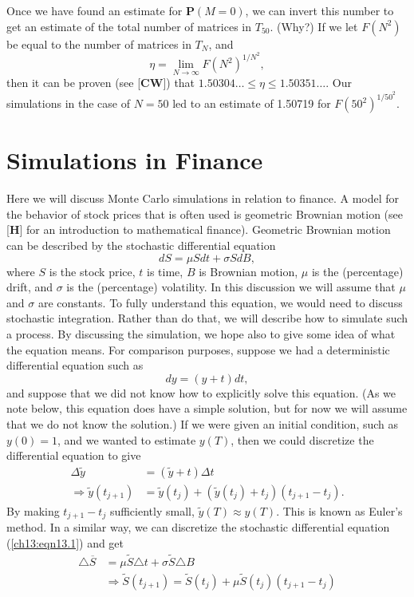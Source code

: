 \documentclass{stml-l}
\theoremstyle{definition}
\numberwithin{equation}{chapter}
\numberwithin{figure}{chapter}
\numberwithin{figure}{section}
\begin{document}
Once we have found an estimate for $\mathbf{P}(M=0)$, we can invert
this number to get an estimate of the total number of matrices in
$T_{50}$. (Why?) If we let $F(N^{2})$ be equal to the number of
matrices in $T_{N}$, and
\begin{equation*}
\eta=\lim_{N\rightarrow\infty}F(N^{2})^{1/N^{2}},
\end{equation*}
then it can be proven (see [\textbf{CW}]) that
$1.50304\ldots\leq\eta\leq 1.50351\ldots$. Our simulations in the
case of $N=50$ led to an estimate of 1.50719 for
$F(50^{2})^{1/50^{2}}$.


\chapter{Simulations in Finance\label{ch13:chap13}}

Here we will discuss Monte Carlo simulations in relation to finance.
A model for the behavior of stock prices that is often used is
geometric Brownian motion (see [\textbf{H}] for an introduction to
mathematical finance). Geometric Brownian motion can be described by
the stochastic differential equation
\begin{equation}
\label{ch13:eqn13.1}dS=\mu Sdt+\sigma SdB,
\end{equation}
where $S$ is the stock price, $t$ is time, $B$ is Brownian motion,
$\mu$ is the (percentage) drift, and $\sigma$ is the (percentage)
volatility. In this discussion we will assume that $\mu$ and
$\sigma$ are constants. To fully understand this equation, we would
need to discuss stochastic integration. Rather than do that, we will
describe how to simulate such a process. By discussing the
simulation, we hope also to give some idea of what the equation
means. For comparison purposes, suppose we had a deterministic
differential equation such as
\begin{equation}
\label{ch13:eqn13.2}dy=(y+t)dt,
\end{equation}
and suppose that we did not know how to explicitly solve this
equation. (As we note below, this equation does have a simple
solution, but for now we will assume that we do not know the
solution.) If we were given an initial condition, such as $y(0)=1$,
and we wanted to estimate $y(T)$, then we could discretize the
differential equation to give
\begin{align*}
\Delta\tilde{y} &= (\tilde{y}+t)\Delta t\\
\Rightarrow\tilde{y}(t_{j+1}) &=
\tilde{y}(t_{j})+(\tilde{y}(t_{j})+t_{j})(t_{j+1}-t_{j}).
\end{align*}
By making $t_{j+1}-t_{j}$ sufficiently small, $\tilde{y}(T)\approx
y(T)$. This is known as Euler's method. In a similar way, we can
discretize the stochastic differential equation
(\ref{ch13:eqn13.1}) and get
\begin{align}\label{ch13:eqn13.3}
\triangle\overline{S}&=\mu\tilde{S}\triangle
t+\sigma\tilde{S}\triangle B \\
&\Rightarrow\tilde{S}(t_{j+1})=\tilde{S}(t_{j})+\mu\tilde{S}(t_{j})(t_{j+1}-t_{j})\nonumber
\end{align}
\end{document}
